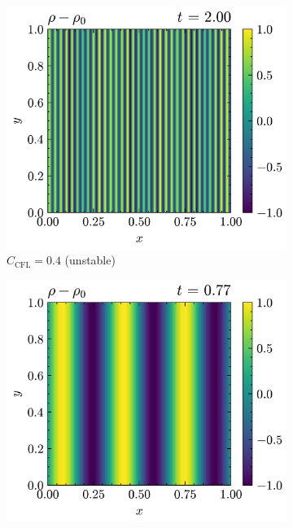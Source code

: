 \documentclass{article}
\begin{document}
\begin{figure}[htbp]
    \centering
    \begin{subfigure}{0.31\textwidth}
        \centering
        \includegraphics[width=\textwidth]{sound_wave/cmax_output_rho_c4_t200.png}
        \caption{$C_{\text{CFL}} = 0.4$ (unstable)}
    \end{subfigure}
    \hfill
    \begin{subfigure}{0.31\textwidth}
        \centering
        \includegraphics[width=\textwidth]{sound_wave/cmax_output_rho_77_stable.png}

\end{subfigure}
\end{figure}
\end{document}
